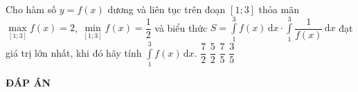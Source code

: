 \begin{ex}%
	Cho hàm số $y = f(x)$ dương và liên tục trên đoạn $\left[1; 3\right]$ thỏa mãn $\max\limits_{[1;3]}f(x)=2$, $\min\limits_{[1;3]}f(x)=\dfrac{1}{2}$ và biểu thức $S=\displaystyle\int\limits_1^3f(x)\mathrm{\,d}x\cdot \displaystyle\int\limits_1^3{\dfrac{1}{f(x)}\mathrm{\,d}x}$ đạt giá trị lớn nhất, khi đó hãy tính $\displaystyle\int\limits_1^3f(x)\mathrm{\,d}x$.
	\choice
	{$\dfrac{7}{2}$}
	{\True $\dfrac{5}{2}$}
	{$\dfrac{7}{5}$}
	{$\dfrac{3}{5}$}
\end{ex}


\newpage
\begin{center}
	\textbf{ĐÁP ÁN}
\end{center}
\begin{multicols}{10}
	 
\end{multicols}
